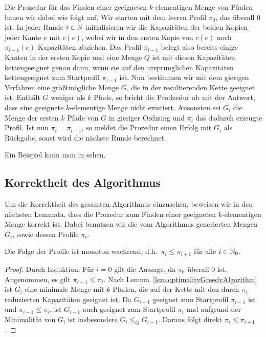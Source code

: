 Die Prozedur für das Finden einer geeigneten $k$-elementigen Menge von Pfaden bauen wir dabei wie folgt auf.
Wir starten mit dem leeren Profil $\pi_0$, das überall 0 ist.
In jeder Runde $i \in \mathbb N$ initialisieren wir die Kapazitäten der beiden Kopien jeder Kante $e$ mit $c(e)$, wobei wir
in den ersten Kopie von $c(e)$ noch $\pi_{i-1}(e)$ Kapazitäten abziehen.
Das Profil $\pi_{i-1}$ belegt also bereits einige Kanten in der ersten Kopie und eine Menge $Q$ ist mit diesen Kapazitäten
kettengeeignet genau dann, wenn sie auf den ursprünglichen Kapazitäten kettengeeignet zum Startprofil $\pi_{i-1}$ ist.
Nun bestimmen wir mit dem gierigen Verfahren eine größtmögliche Menge $G$, die in der resultierenden Kette
geeignet ist.
Enthält $G$ weniger als $k$ Pfade, so bricht die Prodzedur ab mit der Antwort, dass eine geeignete $k$-elementige Menge
nicht existiert.
Ansonsten sei $G_i$ die Menge der ersten $k$ Pfade von $G$ in gieriger Ordnung und $\pi_{i}$ das dadurch erzeugte
Profil.
Ist nun $\pi_i = \pi_{i-1}$, so meldet die Prozedur einen Erfolg mit $G_i$ als Rückgabe, sonst wird die nächste Runde
berechnet.

Ein Beispiel kann man in  sehen.

\subsection{Korrektheit des Algorithmus}\label{subsec:korrektheitCallControlInRings}
Um die Korrektheit des gesamten Algorithmus einzusehen, beweisen wir in den nächsten Lemmata, dass die Prozedur zum
Finden einer geeigneten $k$-elementigen Menge korrekt ist.
Dabei benutzen wir die vom Algorithmus generierten Mengen $G_i$, sowie dessen Profile $\pi_i$.

\begin{lemma}\label{lem:monotonousProfiles}
    Die Folge der Profile ist monoton wachsend, d.h.\ $\pi_i \leq \pi_{i+1}$ für alle $i \in \mathbb N_0$.
\end{lemma}
\begin{proof}
    Durch Induktion: Für $i=0$ gilt die Aussage, da $\pi_0$ überall 0 ist.
    Angenommen, es gilt $\pi_{i-1} \leq \pi_i$.
    Nach Lemma~\ref{lem:optimalityGreedyAlgorithm} ist $G_{i}$ eine minimale Menge mit $k$ Pfaden, die auf der Kette mit den durch $\pi_{i}$
    reduzierten Kapazitäten geeignet ist.
    Da $G_{i-1}$ geeignet zum Startprofil $\pi_{i-1}$ ist und $\pi_{i-1} \leq \pi_i$, ist $G_{i-1}$ auch
    geeignet zum Startprofil $\pi_{i}$ und aufgrund der Minimalität von $G_i$ ist insbesondere $G_i \leq_G G_{i-1}$.
    Daraus folgt direkt $\pi_i \leq \pi_{i+1}$.
\end{proof}

